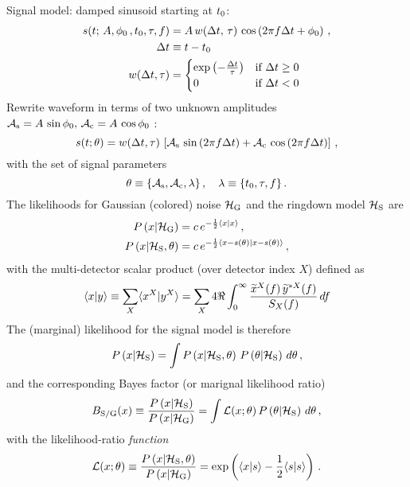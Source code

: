 \documentclass[aps,prd,onecolumn,nofootinbib,superscriptaddress,altaffilletter,floatfix]{revtex4-1}
\begin{document}
Signal model: damped sinusoid starting at $t_0$:
\begin{align}
  \label{eq:1}
  s(t;\,A, \phi_0\,, t_0, \tau, f) &= A\,w(\Delta t,\,\tau)\,\cos\left(2\pi f \Delta t + \phi_0\right)\,,\\
  \Delta t & \equiv t - t_0\,\\
  w(\Delta t, \tau) &=
  \begin{cases}
    \exp\left( -\frac{\Delta t}{\tau} \right) & \text{if } \Delta t \ge 0\,\\
    0  & \text{if } \Delta t < 0
  \end{cases}
\end{align}
Rewrite waveform in terms of two unknown amplitudes $\mathcal{A}_{\mathrm{s}} = A\,\sin\phi_0,\,\mathcal{A}_{\mathrm{c}} = A\,\cos\phi_0$ \cite{bretthorst1988:_bayesian_spectrum}:
\begin{equation}
  \label{eq:2}
  s(t; \theta) = w(\Delta t,\tau)\, \left[ \mathcal{A}_{\mathrm{s}}\,\sin\left(2\pi f \Delta t\right) + \mathcal{A}_{\mathrm{c}}\,\cos\left(2\pi f \Delta t\right) \right]\,,
\end{equation}
with the set of signal parameters
\begin{equation}
  \label{eq:11}
  \theta \equiv \{\mathcal{A}_{\mathrm{s}},\mathcal{A}_{\mathrm{c}}, \lambda\}\,,\quad \lambda \equiv \{t_0,\tau, f\}\,.
\end{equation}
The likelihoods for Gaussian (colored) noise $\mathcal{H}_{\mathrm{G}}$ and the ringdown model $\mathcal{H}_{\mathrm{S}}$ are
\begin{align}
  \label{eq:4}
  P\left(x|\mathcal{H}_{\mathrm{G}}\right) &= c\,e^{-\frac{1}{2}\langle x|x\rangle}\,,\\
  P\left(x|\mathcal{H}_{\mathrm{S}},\theta\right) &= c\,e^{-\frac{1}{2}\langle x-s(\theta)|x-s(\theta)\rangle}\,,
\end{align}
with the multi-detector scalar product (over detector index $X$) defined as
\begin{equation}
  \label{eq:5}
  \langle x|y\rangle\equiv \sum_{X} \langle x^X|y^X\rangle = \sum_X 4\Re\int_0^\infty \frac{\widetilde{x}^X(f)\,\widetilde{y}^{*X}(f)}{S_X(f)}\,df
\end{equation}
The (marginal) likelihood for the signal model is therefore
\begin{equation}
  \label{eq:6}
  P\left(x|\mathcal{H}_{\mathrm{S}}\right) = \int P\left(x|\mathcal{H}_{\mathrm{S}},\theta\right)\,P\left(\theta|\mathcal{H}_{\mathrm{S}}\right)\,d\theta\,,
\end{equation}
and the corresponding Bayes factor (or marignal likelihood ratio)
\begin{equation}
  \label{eq:7}
  B_{\mathrm{S/G}}(x) \equiv \frac{P\left(x|\mathcal{H}_{\mathrm{S}}\right)}{P\left(x|\mathcal{H}_{\mathrm{G}}\right)} = \int \mathcal{L}(x;\theta)\,P\left(\theta|\mathcal{H}_{\mathrm{S}}\right)\,d\theta\,,
\end{equation}
with the likelihood-ratio \emph{function}
\begin{equation}
  \label{eq:8}
  \mathcal{L}(x;\theta) \equiv \frac{P\left(x|\mathcal{H}_{\mathrm{S}},\theta\right)}{P\left(x|\mathcal{H}_{\mathrm{G}}\right)} = \exp\left(\langle x|s\rangle - \frac{1}{2}\langle s|s\rangle\right)\,.
\end{equation}
\end{document}
